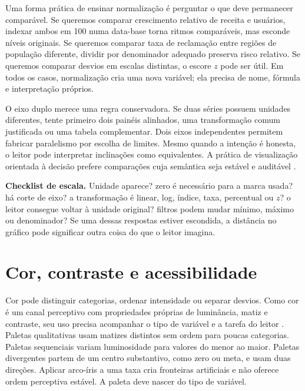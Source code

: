 Uma forma prática de ensinar normalização é perguntar o que deve permanecer comparável. Se queremos comparar crescimento relativo de receita e usuários, indexar ambos em 100 numa data-base torna ritmos comparáveis, mas esconde níveis originais. Se queremos comparar taxa de reclamação entre regiões de população diferente, dividir por denominador adequado preserva risco relativo. Se queremos comparar desvios em escalas distintas, o escore $z$ pode ser útil. Em todos os casos, normalização cria uma nova variável; ela precisa de nome, fórmula e interpretação próprios.

O eixo duplo merece uma regra conservadora. Se duas séries possuem unidades diferentes, tente primeiro dois painéis alinhados, uma transformação comum justificada ou uma tabela complementar. Dois eixos independentes permitem fabricar paralelismo por escolha de limites. Mesmo quando a intenção é honesta, o leitor pode interpretar inclinações como equivalentes. A prática de visualização orientada à decisão prefere comparações cuja semântica seja estável e auditável \cite{few2012,cairo2016,wilke2019}.

\begin{GuidedBox}
\textbf{Checklist de escala.} Unidade aparece? zero é necessário para a marca usada? há corte de eixo? a transformação é linear, log, índice, taxa, percentual ou $z$? o leitor consegue voltar à unidade original? filtros podem mudar mínimo, máximo ou denominador? Se uma dessas respostas estiver escondida, a distância no gráfico pode significar outra coisa do que o leitor imagina.
\end{GuidedBox}


\section{Cor, contraste e acessibilidade}

Cor pode distinguir categorias, ordenar intensidade ou separar desvios. Como cor é um canal perceptivo com propriedades próprias de luminância, matiz e contraste, seu uso precisa acompanhar o tipo de variável e a tarefa do leitor \cite{ware2021,wilke2019}. Paletas qualitativas usam matizes distintos sem ordem para poucas categorias. Paletas sequenciais variam luminosidade para valores do menor ao maior. Paletas divergentes partem de um centro substantivo, como zero ou meta, e usam duas direções. Aplicar arco-íris a uma taxa cria fronteiras artificiais e não oferece ordem perceptiva estável. A paleta deve nascer do tipo de variável.

